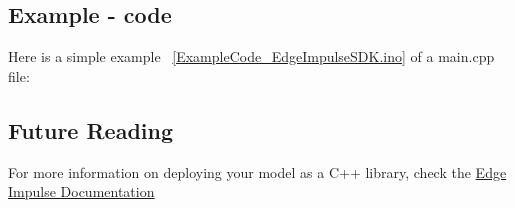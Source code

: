 \subsection{Example - code}
Here is a simple example ~\ref{ExampleCode_EdgeImpulseSDK.ino} of a main.cpp file:


{
	\label{ExampleCode_EdgeImpulseSDK.ino}
}


\subsection{Future Reading}
For more information on deploying your model as a C++ library, check the \href{https://docs.edgeimpulse.com/docs/run-inference/cpp-library/deploy-your-model-as-a-c-library}{Edge Impulse Documentation}
